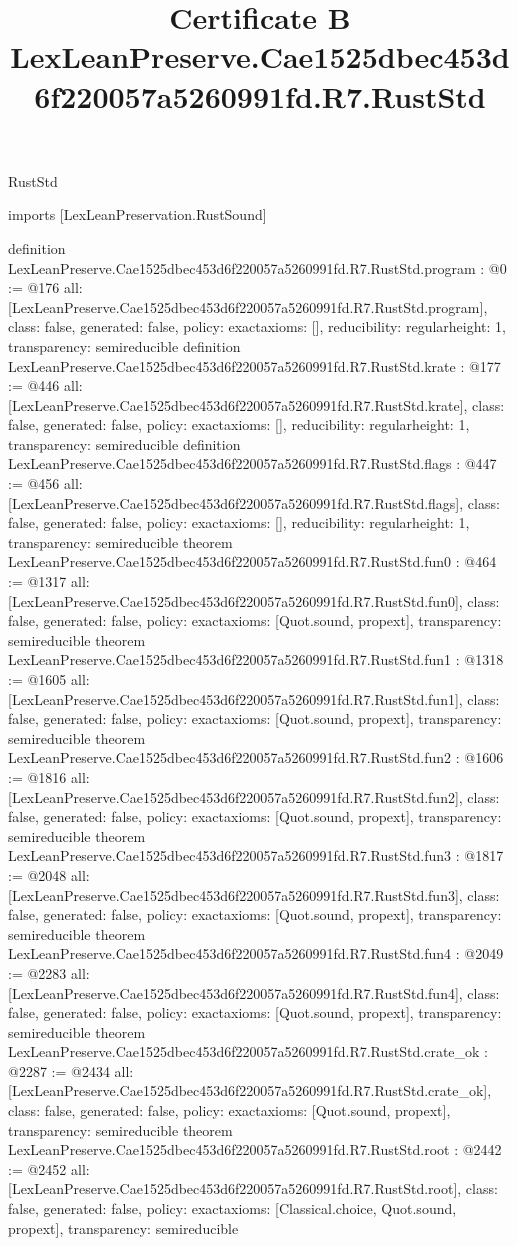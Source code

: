 \begin{lexlean}{RustStd}
\title{Certificate B LexLeanPreserve.Cae1525dbec453d6f220057a5260991fd.R7.RustStd}
\begin{coremodule}
imports [LexLeanPreservation.RustSound]

definition LexLeanPreserve.Cae1525dbec453d6f220057a5260991fd.R7.RustStd.program : @0 := @176 {
  all: [LexLeanPreserve.Cae1525dbec453d6f220057a5260991fd.R7.RustStd.program],
  class: false,
  generated: false,
  policy: exact{axioms: []},
  reducibility: regular{height: 1},
  transparency: semireducible
}
definition LexLeanPreserve.Cae1525dbec453d6f220057a5260991fd.R7.RustStd.krate : @177 := @446 {
  all: [LexLeanPreserve.Cae1525dbec453d6f220057a5260991fd.R7.RustStd.krate],
  class: false,
  generated: false,
  policy: exact{axioms: []},
  reducibility: regular{height: 1},
  transparency: semireducible
}
definition LexLeanPreserve.Cae1525dbec453d6f220057a5260991fd.R7.RustStd.flags : @447 := @456 {
  all: [LexLeanPreserve.Cae1525dbec453d6f220057a5260991fd.R7.RustStd.flags],
  class: false,
  generated: false,
  policy: exact{axioms: []},
  reducibility: regular{height: 1},
  transparency: semireducible
}
theorem LexLeanPreserve.Cae1525dbec453d6f220057a5260991fd.R7.RustStd.fun0 : @464 := @1317 {
  all: [LexLeanPreserve.Cae1525dbec453d6f220057a5260991fd.R7.RustStd.fun0],
  class: false,
  generated: false,
  policy: exact{axioms: [Quot.sound, propext]},
  transparency: semireducible
}
theorem LexLeanPreserve.Cae1525dbec453d6f220057a5260991fd.R7.RustStd.fun1 : @1318 := @1605 {
  all: [LexLeanPreserve.Cae1525dbec453d6f220057a5260991fd.R7.RustStd.fun1],
  class: false,
  generated: false,
  policy: exact{axioms: [Quot.sound, propext]},
  transparency: semireducible
}
theorem LexLeanPreserve.Cae1525dbec453d6f220057a5260991fd.R7.RustStd.fun2 : @1606 := @1816 {
  all: [LexLeanPreserve.Cae1525dbec453d6f220057a5260991fd.R7.RustStd.fun2],
  class: false,
  generated: false,
  policy: exact{axioms: [Quot.sound, propext]},
  transparency: semireducible
}
theorem LexLeanPreserve.Cae1525dbec453d6f220057a5260991fd.R7.RustStd.fun3 : @1817 := @2048 {
  all: [LexLeanPreserve.Cae1525dbec453d6f220057a5260991fd.R7.RustStd.fun3],
  class: false,
  generated: false,
  policy: exact{axioms: [Quot.sound, propext]},
  transparency: semireducible
}
theorem LexLeanPreserve.Cae1525dbec453d6f220057a5260991fd.R7.RustStd.fun4 : @2049 := @2283 {
  all: [LexLeanPreserve.Cae1525dbec453d6f220057a5260991fd.R7.RustStd.fun4],
  class: false,
  generated: false,
  policy: exact{axioms: [Quot.sound, propext]},
  transparency: semireducible
}
theorem LexLeanPreserve.Cae1525dbec453d6f220057a5260991fd.R7.RustStd.crate_ok : @2287 := @2434 {
  all: [LexLeanPreserve.Cae1525dbec453d6f220057a5260991fd.R7.RustStd.crate_ok],
  class: false,
  generated: false,
  policy: exact{axioms: [Quot.sound, propext]},
  transparency: semireducible
}
theorem LexLeanPreserve.Cae1525dbec453d6f220057a5260991fd.R7.RustStd.root : @2442 := @2452 {
  all: [LexLeanPreserve.Cae1525dbec453d6f220057a5260991fd.R7.RustStd.root],
  class: false,
  generated: false,
  policy: exact{axioms: [Classical.choice, Quot.sound, propext]},
  transparency: semireducible
}


\end{coremodule}
\end{lexlean}
